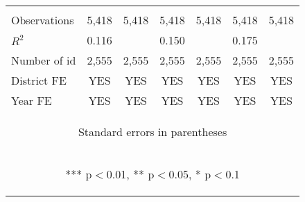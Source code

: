 \begin{center}
\begin{tabular}{lcccccc}
\vspace{4pt} & \begin{footnotesize}\end{footnotesize} & \begin{footnotesize}\end{footnotesize} & \begin{footnotesize}\end{footnotesize} & \begin{footnotesize}\end{footnotesize} & \begin{footnotesize}\end{footnotesize} & \begin{footnotesize}\end{footnotesize} \\
Observations & 5,418 & 5,418 & 5,418 & 5,418 & 5,418 & 5,418 \\
$R^2$ & 0.116 &  & 0.150 &  & 0.175 &  \\
Number of id & 2,555 & 2,555 & 2,555 & 2,555 & 2,555 & 2,555 \\
District FE & YES & YES & YES & YES & YES & YES \\
 Year FE & YES & YES & YES & YES & YES & YES \\ \hline
\multicolumn{7}{c}{\begin{footnotesize} Standard errors in parentheses\end{footnotesize}} \\
\multicolumn{7}{c}{\begin{footnotesize} *** p$<$0.01, ** p$<$0.05, * p$<$0.1\end{footnotesize}} \\
\end{tabular}
\end{center}
